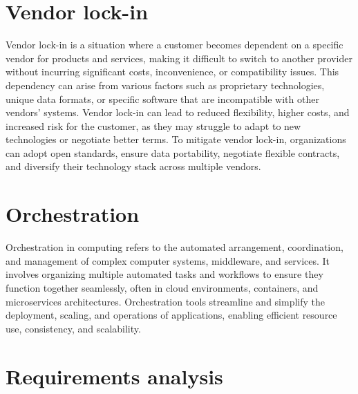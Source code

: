


\section{Vendor lock-in}

Vendor lock-in is a situation where a customer becomes dependent on a specific vendor for products and services,
making it difficult to switch to another provider without incurring significant costs, inconvenience,
or compatibility issues. This dependency can arise from various factors such as proprietary technologies,
unique data formats, or specific software that are incompatible with other vendors' systems.
Vendor lock-in can lead to reduced flexibility, higher costs, and increased risk for the customer,
as they may struggle to adapt to new technologies or negotiate better terms. To mitigate vendor lock-in, organizations can adopt open standards, ensure data portability, negotiate flexible contracts, and diversify their technology stack across multiple vendors.


\section{Orchestration}
Orchestration in computing refers to the automated arrangement, coordination, and management of complex computer systems, middleware, and services. It involves organizing multiple automated tasks and workflows to ensure they function together seamlessly, often in cloud environments, containers, and microservices architectures. Orchestration tools streamline and simplify the deployment, scaling, and operations of applications, enabling efficient resource use, consistency, and scalability.




\section{Requirements analysis}

